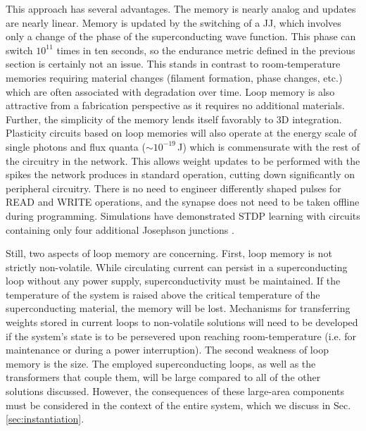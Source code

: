 \documentclass[twocolumn]{article}
\begin{document}
This approach has several advantages. The memory is nearly analog and updates are nearly linear. Memory is updated by the switching of a JJ, which involves only a change of the phase of the superconducting wave function. This phase can switch $10^{11}$ times in ten seconds, so the endurance metric defined in the previous section is certainly not an issue. This stands in contrast to room-temperature memories requiring material changes (filament formation, phase changes, etc.) which are often associated with degradation over time. Loop memory is also attractive from a fabrication perspective as it requires no additional materials. Further, the simplicity of the memory lends itself favorably to 3D integration. Plasticity circuits based on loop memories will also operate at the energy scale of single photons and flux quanta ($\sim 10^{-19}$\,J) which is commensurate with the rest of the circuitry in the network. This allows weight updates to be performed with the spikes the network produces in standard operation, cutting down significantly on peripheral circuitry. There is no need to engineer differently shaped pulses for READ and WRITE operations, and the synapse does not need to be taken offline during programming. Simulations have demonstrated STDP learning with circuits containing only four additional Josephson junctions \cite{shainline2019superconducting}. 

Still, two aspects of loop memory are concerning. First, loop memory is not strictly non-volatile. While circulating current can persist in a superconducting loop without any power supply, superconductivity must be maintained. If the temperature of the system is raised above the critical temperature of the superconducting material, the memory will be lost. Mechanisms for transferring weights stored in current loops to non-volatile solutions will need to be developed if the system's state is to be persevered upon reaching room-temperature (i.e. for maintenance or during a power interruption). The second weakness of loop memory is the size. The employed superconducting loops, as well as the transformers that couple them, will be large compared to all of the other solutions discussed. However, the consequences of these large-area components must be considered in the context of the entire system, which we discuss in Sec.\,\ref{sec:instantiation}.
\end{document}
